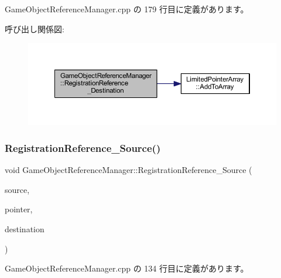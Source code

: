  Game\+Object\+Reference\+Manager.\+cpp の 179 行目に定義があります。

呼び出し関係図\+:\nopagebreak
\begin{figure}[H]
\begin{center}
\leavevmode
\includegraphics[width=350pt]{class_game_object_reference_manager_a8aaa23d4a8644a100b7154c92b845f78_cgraph}
\end{center}
\end{figure}
\mbox{\label{class_game_object_reference_manager_aa4ca837b7d576db6b11745b2f8530b4d}} 
\subsubsection{\texorpdfstring{Registration\+Reference\+\_\+\+Source()}{RegistrationReference\_Source()}}
{\footnotesize\ttfamily void Game\+Object\+Reference\+Manager\+::\+Registration\+Reference\+\_\+\+Source (\begin{DoxyParamCaption}\item[{\mbox{\hyperlink{class_game_object_base}{Game\+Object\+Base}} $\ast$}]{source,  }\item[{void $\ast$}]{pointer,  }\item[{\mbox{\hyperlink{class_game_object_base}{Game\+Object\+Base}} $\ast$}]{destination }\end{DoxyParamCaption})\hspace{0.3cm}{\ttfamily [private]}}



 Game\+Object\+Reference\+Manager.\+cpp の 134 行目に定義があります。

